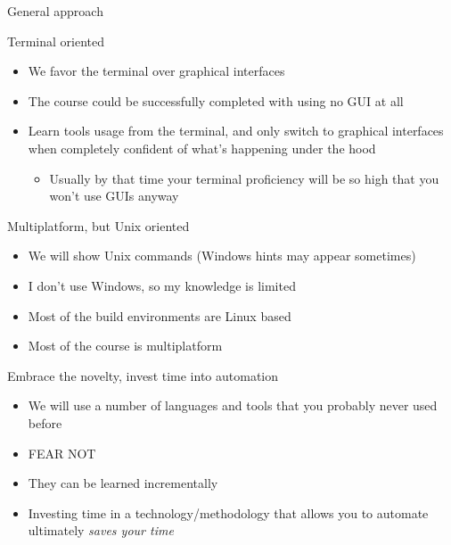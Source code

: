 \documentclass[presentation]{beamer}
\begin{document}
\begin{frame}{General approach}
    \begin{block} {Terminal oriented}
        \begin{itemize}
            \item We favor the terminal over graphical interfaces
            \item The course could be successfully completed with using no GUI at all
            \item Learn tools usage from the terminal, and only switch to graphical interfaces when completely confident of what's happening under the hood
            \begin{itemize}
                \item Usually by that time your terminal proficiency will be so high that you won't use GUIs anyway
            \end{itemize}
        \end{itemize}
    \end{block}
    \begin{block} {Multiplatform, but Unix oriented}
        \begin{itemize}
            \item We will show Unix commands (Windows hints may appear sometimes)
            \item I don't use Windows, so my knowledge is limited
            \item Most of the build environments are Linux based
            \item Most of the course is multiplatform
        \end{itemize}
    \end{block}
    \begin{block} {Embrace the novelty, invest time into automation}
        \begin{itemize}
            \item We will use a number of languages and tools that you probably never used before
            \item FEAR NOT
            \item They can be learned incrementally
            \item Investing time in a technology/methodology that allows you to automate ultimately \textit{saves your time}
        \end{itemize}
    \end{block}
\end{frame}

\section*{\refname}
\begin{frame}[allowframebreaks]
  \frametitle{\refname}
  \scriptsize
  
  
\end{frame}
\section*{\refname}
\end{document}
